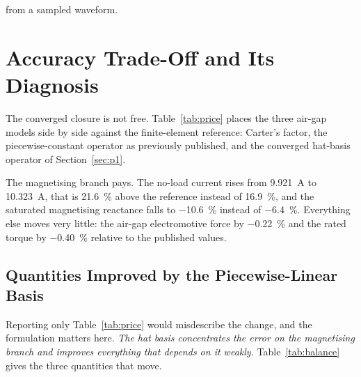\documentclass[10pt,a4paper,twocolumn]{article}
\theoremstyle{plain}
\theoremstyle{remark}
\begin{document}
\begin{table}[tp]
\begin{threeparttable}
\begin{tablenotes}[flushleft]
from a sampled waveform.
\end{tablenotes}
\end{threeparttable}
\caption{\emph{(a)} Waveform deviation of the mid-gap field against
two-dimensional finite elements, evaluated pointwise at the reference
sampling angles and registered on the fundamental phase, at the
network's rotor position and at the reference's own; \emph{(b)} what the
unmatched rotor position was worth on the four figures this section
quotes; \emph{(c)} the spatial spectrum behind the deviation. A
fundamental within \SI{0.3}{\percent} coexists with a waveform deviation
above half the reference root-mean-square.}
\label{tab:fielderr}
\end{table}



\section{Accuracy Trade-Off and Its Diagnosis}
\label{sec:price}

The converged closure is not free. Table~\ref{tab:price} places the
three air-gap models side by side against the finite-element reference:
Carter's factor, the piecewise-constant operator as previously
published, and the converged hat-basis operator of
Section~\ref{sec:p1}.

The magnetising branch pays. The no-load current rises from
\SI{9.921}{\ampere} to \SI{10.323}{\ampere}, that is
\SI{+21.6}{\percent} above the reference instead of
\SI{+16.9}{\percent}, and the saturated magnetising reactance falls to
\SI{-10.6}{\percent} instead of \SI{-6.4}{\percent}. Everything else
moves very little: the air-gap electromotive force by
\SI{-0.22}{\percent} and the rated torque by \SI{-0.40}{\percent}
relative to the published values.


\subsection{Quantities Improved by the Piecewise-Linear Basis}

Reporting only Table~\ref{tab:price} would misdescribe the change, and
the formulation matters here. \emph{The hat basis concentrates the error
on the magnetising branch and improves everything that depends on it
weakly.} Table~\ref{tab:balance} gives the three quantities that move.
\end{document}
